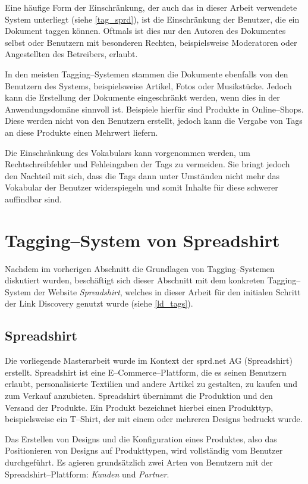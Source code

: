 Eine häufige Form der Einschränkung, der auch das in dieser Arbeit verwendete System unterliegt (siehe \cref{tag_sprd}), ist die Einschränkung der Benutzer, die ein Dokument taggen können. Oftmals ist dies nur den Autoren des Dokumentes selbst oder Benutzern mit besonderen Rechten, beispielsweise Moderatoren oder Angestellten des Betreibers, erlaubt.

In den meisten Tagging--Systemen stammen die Dokumente ebenfalls von den Benutzern des Systems, beispielsweise Artikel, Fotos oder Musikstücke. Jedoch kann die Erstellung der Dokumente eingeschränkt werden, wenn dies in der Anwendungsdomäne sinnvoll ist. Beispiele hierfür sind Produkte in Online--Shops. Diese werden nicht von den Benutzern erstellt, jedoch kann die Vergabe von Tags an diese Produkte einen Mehrwert liefern.

Die Einschränkung des Vokabulars kann vorgenommen werden, um Rechtschreibfehler und Fehleingaben der Tags zu vermeiden. Sie bringt jedoch den Nachteil mit sich, dass die Tags dann unter Umständen nicht mehr das Vokabular der Benutzer widerspiegeln und somit Inhalte für diese schwerer auffindbar sind.

\section{Tagging--System von Spreadshirt}

Nachdem im vorherigen Abschnitt die Grundlagen von Tagging--Systemen diskutiert wurden, beschäftigt sich dieser Abschnitt mit dem konkreten Tagging--System der Website \emph{Spreadshirt}, welches in dieser Arbeit für den initialen Schritt der Link Discovery genutzt wurde (siehe \cref{ld_tags}).

\subsection{Spreadshirt}
\label{spreadshirt}

Die vorliegende Masterarbeit wurde im Kontext der sprd.net AG (Spreadshirt) \cite{sprd2013} erstellt. Spreadshirt ist eine E--Commerce--Plattform, die es seinen Benutzern erlaubt, personalisierte Textilien und andere Artikel zu gestalten, zu kaufen und zum Verkauf anzubieten. Spreadshirt übernimmt die Produktion und den Versand der Produkte. Ein Produkt bezeichnet hierbei einen Produkttyp, beispielsweise ein T--Shirt, der mit einem oder mehreren Designs bedruckt wurde.

Das Erstellen von Designs und die Konfiguration eines Produktes, also das Positionieren von Designs auf Produkttypen, wird vollständig vom Benutzer durchgeführt. Es agieren grundsätzlich zwei Arten von Benutzern mit der Spreadshirt--Plattform: \emph{Kunden} und \emph{Partner}.

